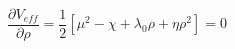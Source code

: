 \begin{equation}
\frac{\partial V_{eff}}{\partial \rho} = \frac{1}{2} [\mu^2 - \chi+\lambda_0 \rho
+ \eta \rho^2]= 0
\end{equation}

